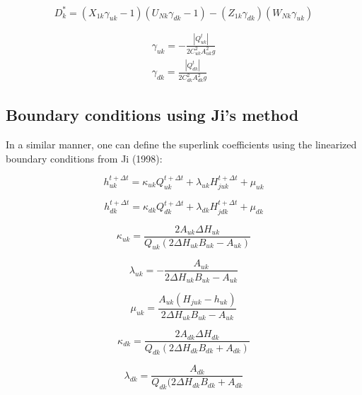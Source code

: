 \documentclass[11pt]{article}
\begin{document}
\begin{equation}
  D_k^* = (X_{1k} \gamma_{uk} - 1)(U_{Nk} \gamma_{dk} - 1) - (Z_{1k} \gamma_{dk})(W_{Nk} \gamma_{uk})
\end{equation}

\begin{align}
  \gamma_{uk} = -\frac{|Q_{uk}^{t}|}{2 C_{uk}^2 A_{uk}^2 g} \\
  \gamma_{dk} = \frac{|Q_{dk}^{t}|}{2 C_{dk}^2 A_{dk}^2 g}
\end{align}

\subsection{Boundary conditions using Ji's method}

In a similar manner, one can define the superlink coefficients using the
linearized boundary conditions from Ji (1998):

\begin{equation}
 h_{uk}^{t + \Delta t} = \kappa_{uk} Q_{uk}^{t + \Delta t} + \lambda_{uk} H_{juk}^{t + \Delta t} + \mu_{uk} 
\end{equation}

\begin{equation}
 h_{dk}^{t + \Delta t} = \kappa_{dk} Q_{dk}^{t + \Delta t} + \lambda_{dk} H_{jdk}^{t + \Delta t} + \mu_{dk} 
\end{equation}

\begin{equation}
  \kappa_{uk} = \frac{2 A_{uk} \Delta H_{uk}}{Q_{uk} (2 \Delta H_{uk} B_{uk} - A_{uk})}
\end{equation}

\begin{equation}
  \lambda_{uk} = - \frac{A_{uk}}{2 \Delta H_{uk} B_{uk} - A_{uk}}
\end{equation}

\begin{equation}
  \mu_{uk} = \frac{A_{uk} (H_{juk} - h_{uk})}{2 \Delta H_{uk} B_{uk} - A_{uk}}
\end{equation}

\begin{equation}
  \kappa_{dk} = \frac{2 A_{dk} \Delta H_{dk}}{Q_{dk} (2 \Delta H_{dk} B_{dk} + A_{dk})}
\end{equation}

\begin{equation}
  \lambda_{dk} = \frac{A_{dk}}{Q_{dk} (2 \Delta H_{dk} B_{dk} + A_{dk}}
\end{equation}
\end{document}
